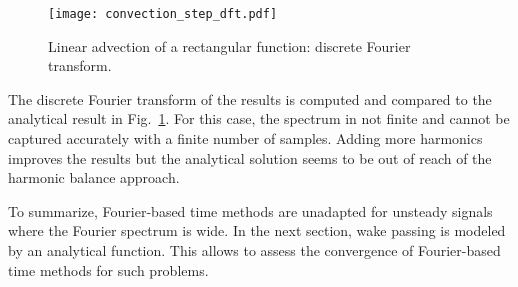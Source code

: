 \begin{figure}[htp]
  \centering
  \texttt{[image: convection\_step\_dft.pdf]}
  \caption{Linear advection of a rectangular function: 
  discrete Fourier transform.}
  \label{fig:dft_step}
\end{figure}
The discrete Fourier transform of the results
is computed and compared to the analytical result in Fig.~\ref{fig:dft_step}.
For this case, the spectrum in not finite and cannot be captured accurately
with a finite number of samples.
Adding more harmonics improves the results but the analytical
solution seems to be out of reach of the harmonic
balance approach. 

To summarize, Fourier-based time methods are unadapted
for unsteady signals where the Fourier spectrum is wide.
In the next section, wake passing is modeled by an analytical
function. This allows to assess the convergence of Fourier-based time
methods for such problems.
